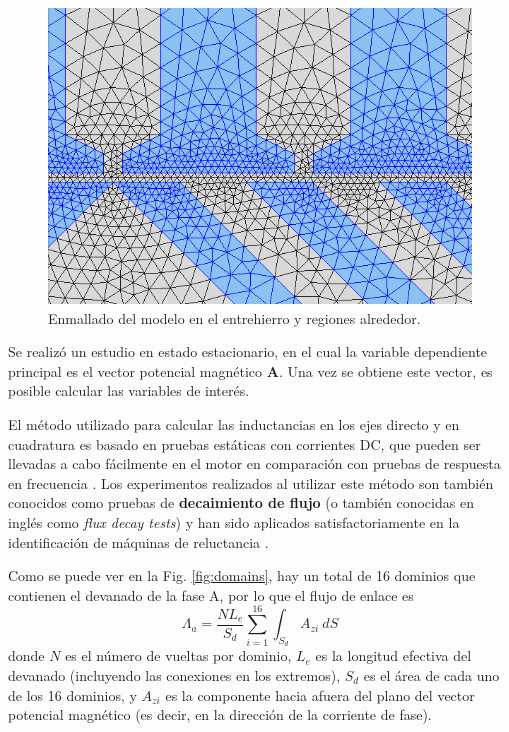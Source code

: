 \begin{figure}[btp]
\centering
\includegraphics[scale=0.6]{../img/Desarrollo_de_un_diseno_inicial/mesh}
\caption{Enmallado del modelo en el entrehierro y regiones alrededor.}
\label{fig:mesh}
\end{figure}

Se realizó un estudio en estado estacionario, en el cual la variable dependiente principal es el vector potencial magnético $\mathbf{A}$. Una vez se obtiene este vector, es posible calcular las variables de interés.

El método utilizado para calcular las inductancias en los ejes directo y en cuadratura es basado en pruebas estáticas con corrientes DC, que pueden ser llevadas a cabo fácilmente en el motor en comparación con pruebas de respuesta en frecuencia \cite{boje1990}. Los experimentos realizados al utilizar este método son también conocidos como pruebas de \textbf{decaimiento de flujo} (o también conocidas en inglés como \textit{flux decay tests}) y han sido aplicados satisfactoriamente en la identificación de máquinas de reluctancia \cite{agarlita2012,boldea2015}.

Como se puede ver en la Fig. \ref{fig:domains}, hay un total de 16 dominios que contienen el devanado de la fase A, por lo que el flujo de enlace es \cite{bianchi2011}
\begin{equation}
\Lambda_a = \frac{NL_e}{S_d}\sum_{i=1}^{16}\int_{S_d} A_{zi}\ dS
\end{equation}
donde $N$ es el número de vueltas por dominio, $L_e$ es la longitud efectiva del devanado (incluyendo las conexiones en los extremos), $S_d$ es el área de cada uno de los 16 dominios, y $A_{zi}$ es la componente hacia afuera del plano del vector potencial magnético (es decir, en la dirección de la corriente de fase).

